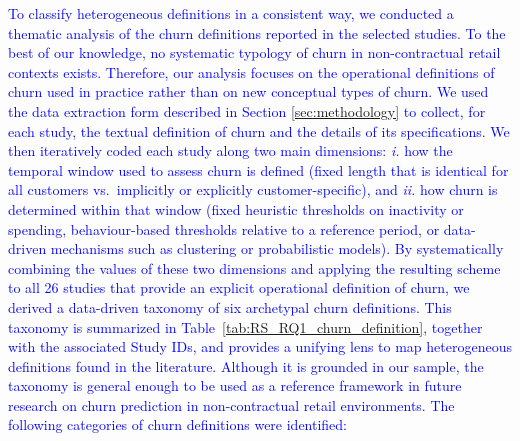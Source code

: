






\textcolor{blue}{To classify heterogeneous definitions in a consistent way, we conducted a thematic analysis of the churn definitions reported in the selected studies. To the best of our knowledge, no systematic typology of churn in non-contractual retail contexts exists.  Therefore, our analysis focuses on the operational definitions of churn used in practice rather than on new conceptual types of churn.
We used the data extraction form described in Section \ref{sec:methodology} to collect, for each study, the textual definition of churn and the details of its specifications.
We then iteratively coded each study along two main dimensions: \emph{i.} how the temporal window used to assess churn is defined (fixed length that is identical for all customers vs.\ implicitly or explicitly customer-specific), and \emph{ii.} how churn is determined within that window (fixed heuristic thresholds on inactivity or spending, behaviour-based thresholds relative to a reference period, or data-driven mechanisms such as clustering or probabilistic models). 
By systematically combining the values of these two dimensions and applying the resulting scheme to all 26 studies that provide an explicit operational definition of churn, we derived a data-driven taxonomy of six archetypal churn definitions. This taxonomy is summarized in Table~\ref{tab:RS_RQ1_churn_definition}, together with the associated Study IDs, and provides a unifying lens to map heterogeneous definitions found in the literature. Although it is grounded in our sample, the taxonomy is general enough to be used as a reference framework in future research on churn prediction in non-contractual retail environments.
The following categories of churn definitions were identified:}


